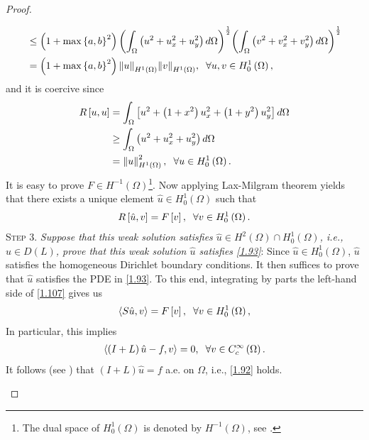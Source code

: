 \documentclass[11pt,a4paper]{article}
\numberwithin{equation}{section}
\numberwithin{equation}{section}
\begin{document}
\begin{proof}
\begin{enumerate}
\begin{align}
& \le \left( {1 + \max {{\left\{ {a,b} \right\}}^2}} \right){\left( {\int_\Omega  {\left( {{u^2} + u_x^2 + u_y^2} \right)d\Omega } } \right)^{\frac{1}{2}}}{\left( {\int_\Omega  {\left( {{v^2} + v_x^2 + v_y^2} \right)d\Omega } } \right)^{\frac{1}{2}}}\\
& = \left( {1 + \max {{\left\{ {a,b} \right\}}^2}} \right){\left\| u \right\|_{{H^1}\left( \Omega  \right)}}{\left\| v \right\|_{{H^1}\left( \Omega  \right)}},\hspace{0.2cm} \forall u,v \in H_0^1\left( \Omega  \right) ,
\end{align}
and it is coercive since
\begin{align}
R\left[ {u,u} \right] &= \int_\Omega  {\left[ {{u^2} + \left( {1 + {x^2}} \right)u_x^2 + \left( {1 + {y^2}} \right)u_y^2} \right]d\Omega } \\
 &\ge \int_\Omega  {\left( {{u^2} + u_x^2 + u_y^2} \right)d\Omega } \\
 &= \left\| u \right\|_{{H^1}\left( \Omega  \right)}^2,\hspace{0.2cm}\forall u \in H_0^1\left( \Omega  \right).
\end{align}
It is easy to prove $F \in {H^{ - 1}}\left( \Omega  \right)$\footnote{The dual space of $H_0^1\left(\Omega\right)$ is denoted by $H^{-1}\left(\Omega\right)$, see \cite[p. 291]{Haim}.}. Now applying Lax-Milgram theorem yields that there exists a unique element $\hat u \in H_0^1\left( \Omega  \right)$ such that
\begin{align}
\label{1.107}
R\left[ {\hat u,v} \right] = F\left[ v \right],\hspace{0.2cm}\forall v \in H_0^1\left( \Omega  \right).
\end{align}
\textsc{Step 3.} \textit{Suppose that this weak solution satisfies $\hat u \in {H^2}\left( \Omega  \right) \cap H_0^1\left( \Omega  \right)$, i.e., $\hat u \in D\left( L \right)$, prove that this weak solution $\hat u$ satisfies \eqref{1.93}}: Since $\hat u \in H_0^1\left(\Omega\right)$, $\hat u$ satisfies the homogeneous Dirichlet boundary conditions. It then suffices to prove that $\hat u$ satisfies the PDE in \eqref{1.93}. To this end, integrating by parts the left-hand side of \eqref{1.107} gives us 
\begin{align}
\left\langle {S\hat u,v} \right\rangle  = F\left[ v \right],\hspace{0.2cm}\forall v \in H_0^1\left( \Omega  \right),
\end{align}
In particular, this implies
\begin{align}
\left\langle {\left( {I + L} \right)\hat u - f,v} \right\rangle  = 0,\hspace{0.2cm}\forall v \in C_c^\infty \left( \Omega  \right).
\end{align}
It follows (see \cite[Corollary 4.24, p. 110]{Haim}) that $\left( {I + L} \right)\hat u = f$ a.e. on $\Omega$, i.e., \eqref{1.92} holds. 


\end{enumerate}
\end{proof}
\end{document}
